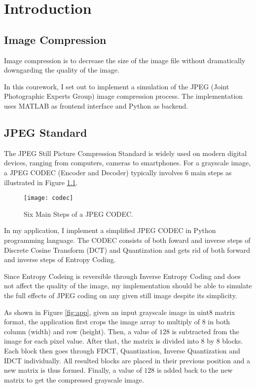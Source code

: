 \chapter{Introduction}
\label{chap:introduction}

\section{Image Compression}

Image compression is to decrease the size of the image file without dramatically downgarding the quality of the image.

In this courework, I set out to implement a simulation of the JPEG (Joint Photographic Experts Group) image compression process\citep{wallace1992jpeg}. The implementation uses MATLAB as frontend interface and Python as backend.

\section{JPEG Standard}

The JPEG Still Picture Compression Standard is widely used on modern digital devices, ranging from computers, cameras to smartphones. For a grayscale image, a JPEG CODEC (Encoder and Decoder) typically involves 6 main steps as illustrated in Figure \ref{fig:codec}.

\begin{figure}
\centering
\texttt{[image: codec]}
\caption{Six Main Steps of a JPEG CODEC.}
\label{fig:codec}
\end{figure}

In my application, I implement a simplified JPEG CODEC in Python programming language. The CODEC consists of both foward and inverse steps of Discrete Cosine Transform (DCT) and Quantization and gets rid of both forward and inverse steps of Entropy Coding. 

Since Entropy Codeing is reversible through Inverse Entropy Coding and does not affect the quality of the image, my implementation should be able to simulate the full effects of JPEG coding on any given still image despite its simplicity.

As shown in Figure \ref{fig:app}, given an input grayscale image in uint8 matrix format, the application first crops the image array to multiply of $8$ in both column (width) and row (height). Then, a value of $128$ is subtracted from the image for each pixel value. After that, the matrix is divided into 8 by 8 blocks. Each block then goes through FDCT, Quantization, Inverse Quantization and IDCT individually.  All resulted blocks are placed in their previous position and a new matrix is thus formed. Finally, a value of $128$ is added back to the new matrix to get the compressed grayscale image. 

